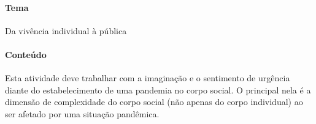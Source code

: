 \documentclass[12pt]{extarticle}
\begin{document}

\paragraph{Tema} Da vivência individual à pública

\paragraph{Conteúdo}

Esta atividade deve trabalhar com a imaginação e o sentimento de
urgência diante do estabelecimento de uma pandemia no corpo social. O
principal nela é a dimensão de complexidade do corpo social (não apenas
do corpo individual) ao ser afetado por uma situação pandêmica.
\end{document}

